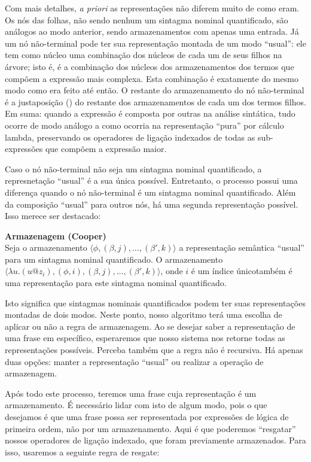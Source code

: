 Com mais detalhes, \textit{a priori} as representações não diferem muito de como eram. Os nós das folhas, não sendo nenhum um sintagma nominal quantificado, são análogos ao modo anterior, sendo armazenamentos com apenas uma entrada. Já um nó não-terminal pode ter sua representação montada de um modo ``usual'': ele tem como núcleo uma combinação dos núcleos de cada um de seus filhos na árvore; isto é, é a combinação dos núcleos dos armazenamentos dos termos que compõem a expressão mais complexa. Esta combinação é exatamente do mesmo modo como era feito até então. O restante do armazenamento do nó não-terminal é a justaposição () do restante dos armazenamentos de cada um dos termos filhos. Em suma: quando a expressão é composta por outras na análise sintática, tudo ocorre de modo análogo a como ocorria na representação ``pura'' por cálculo lambda, preservando os operadores de ligação indexados de todas as sub-expressões que compõem a expressão maior.

Caso o nó não-terminal não seja um sintagma nominal quantificado, a represnetação ``usual'' é a sua única possível. Entretanto, o processo possui uma diferença quando o nó não-terminal é um sintagma nominal quantificado. Além da composição ``usual'' para outros nós, há uma segunda representação possível. Isso merece ser destacado:

\begin{oframed}\textbf{Armazenagem (Cooper)}\\
Seja o armazenamento $\langle\phi, (\beta, j), \dots, (\beta', k)\rangle$ a representação semântica ``usual'' para um sintagma nominal quantificado. O armazenamento $\langle\lambda u.(u@z_i), (\phi, i), (\beta, j), \dots, (\beta', k)\rangle $, onde $i$ é um índice único\footnotemark também é uma representação para este sintagma nominal quantificado.
\end{oframed}

Isto significa que sintagmas nominais quantificados podem ter suas representações montadas de dois modos. Neste ponto, nosso algoritmo terá uma escolha de aplicar ou não a regra de armazenagem. Ao se desejar saber a representação de uma frase em específico, esperaremos que nosso sistema nos retorne todas as representações possíveis. Perceba também que a regra não é recursiva. Há apenas duas opções: manter a representação ``usual'' ou realizar a operação de armazenagem.

Após todo este processo, teremos uma frase cuja representação é um armazenamento. É necessário lidar com isto de algum modo, pois o que desejamos é que uma frase possa ser representada por expressões de lógica de primeira ordem, não por um armazenamento. Aqui é que poderemos ``resgatar'' nossos operadores de ligação indexado, que foram previamente armazenados. Para isso, usaremos a seguinte regra de resgate:

